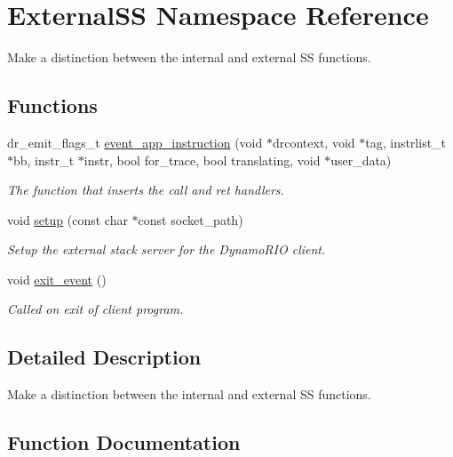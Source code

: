 \hypertarget{namespace_external_s_s}{}\section{External\+SS Namespace Reference}
\label{namespace_external_s_s}


Make a distinction between the internal and external SS functions.  


\subsection*{Functions}
\begin{DoxyCompactItemize}
\item 
dr\+\_\+emit\+\_\+flags\+\_\+t \hyperlink{namespace_external_s_s_a20e2ed7203e7e62d060cd8e020016c69}{event\+\_\+app\+\_\+instruction} (void $\ast$drcontext, void $\ast$tag, instrlist\+\_\+t $\ast$bb, instr\+\_\+t $\ast$instr, bool for\+\_\+trace, bool translating, void $\ast$user\+\_\+data)
\begin{DoxyCompactList}\small\item\em The function that inserts the call and ret handlers. \end{DoxyCompactList}\item 
void \hyperlink{namespace_external_s_s_a1ab997e2712a2124a7056765313589a1}{setup} (const char $\ast$const socket\+\_\+path)
\begin{DoxyCompactList}\small\item\em Setup the external stack server for the Dynamo\+R\+IO client. \end{DoxyCompactList}\item 
void \hyperlink{namespace_external_s_s_ad7eae72b68a78913eb9e92f19cd53868}{exit\+\_\+event} ()
\begin{DoxyCompactList}\small\item\em Called on exit of client program. \end{DoxyCompactList}\end{DoxyCompactItemize}


\subsection{Detailed Description}
Make a distinction between the internal and external SS functions. 

\subsection{Function Documentation}
